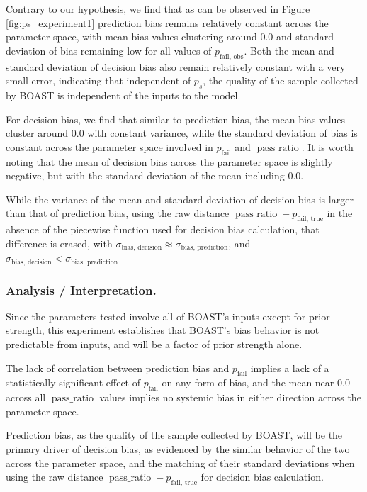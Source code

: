     Contrary to our hypothesis, we find that as can be observed in Figure \ref{fig:ps_experiment1} prediction bias remains relatively constant across the parameter space, with mean bias values clustering around $0.0$ and standard deviation of bias remaining low for all values of $p_\text{fail, obs}$. Both the mean and standard deviation of decision bias also remain relatively constant with a very small error, indicating that independent of $p_s$, the quality of the sample collected by BOAST is independent of the inputs to the model.

    For decision bias, we find that similar to prediction bias, the mean bias values cluster around $0.0$ with constant variance, while the standard deviation of bias is constant across the parameter space involved in $p_\text{fail}$ and $\operatorname{pass\_ratio}$. It is worth noting that the mean of decision bias across the parameter space is slightly negative, but with the standard deviation of the mean including $0.0$.

    While the variance of the mean and standard deviation of decision bias is larger than that of prediction bias, using the raw distance $\operatorname{pass\_ratio} - p_\text{fail, true}$ in the absence of the piecewise function used for decision bias calculation, that difference is erased, with $\sigma_\text{bias, decision} \approx \sigma_\text{bias, prediction}$, and $\sigma_\text{bias, decision} < \sigma_\text{bias, prediction}$
    
    \subsubsection{Analysis / Interpretation.}

    Since the parameters tested involve all of BOAST's inputs except for prior strength, this experiment establishes that BOAST's bias behavior is not predictable from inputs, and will be a factor of prior strength alone.

    The lack of correlation between prediction bias and $p_\text{fail}$ implies a lack of a statistically significant effect of $p_\text{fail}$ on any form of bias, and the mean near $0.0$ across all $\operatorname{pass\_ratio}$ values implies no systemic bias in either direction across the parameter space.

    Prediction bias, as the quality of the sample collected by BOAST, will be the primary driver of decision bias, as evidenced by the similar behavior of the two across the parameter space, and the matching of their standard deviations when using the raw distance $\operatorname{pass\_ratio} - p_\text{fail, true}$ for decision bias calculation.


